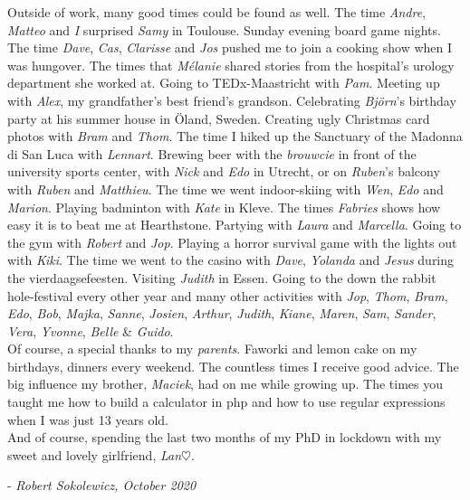 Outside of work, many good times could be found as well. The time \emph{Andre}, \emph{Matteo} and \emph{I} surprised \emph{Samy} in Toulouse. Sunday evening board game nights. The time \emph{Dave}, \emph{Cas}, \emph{Clarisse} and \emph{Jos} pushed me to join a cooking show when I was hungover. The times that \emph{M\'elanie} shared stories from the hospital's urology department she worked at. Going to TEDx-Maastricht with \emph{Pam}. Meeting up with \emph{Alex}, my grandfather's best friend's grandson. Celebrating \emph{Bj\"orn}'s birthday party at his summer house in \"Oland, Sweden. 
Creating ugly Christmas card photos with \emph{Bram} and \emph{Thom}. The time I hiked up the Sanctuary of the Madonna di San Luca with \emph{Lennart}. 
Brewing beer with the \emph{brouwcie} in front of the university sports center, with \emph{Nick} and \emph{Edo} in Utrecht, or on \emph{Ruben}'s balcony with \emph{Ruben} and \emph{Matthieu}. The time we went indoor-skiing with \emph{Wen}, \emph{Edo} and \emph{Marion}. Playing badminton with \emph{Kate} in Kleve. The times \emph{Fabries} shows how easy it is to beat me at Hearthstone. Partying with \emph{Laura} and \emph{Marcella}. Going to the gym with \emph{Robert} and \emph{Jop}. Playing a horror survival game with the lights out with \emph{Kiki}. The time we went to the casino with \emph{Dave}, \emph{Yolanda} and \emph{Jesus} during the vierdaagsefeesten.  Visiting \emph{Judith} in Essen. Going to the down the rabbit hole-festival every other year and many other activities with \emph{Jop}, \emph{Thom}, \emph{Bram}, \emph{Edo}, \emph{Bob}, \emph{Majka}, \emph{Sanne}, \emph{Josien}, \emph{Arthur}, \emph{Judith}, \emph{Kiane}, \emph{Maren}, \emph{Sam}, \emph{Sander}, \emph{Vera}, \emph{Yvonne}, \emph{Belle} \& \emph{Guido}. \\[0.5em]

Of course, a special thanks to my \emph{parents}. Faworki and lemon cake on my birthdays, dinners every weekend. The countless times I receive good advice. The big influence my brother, \emph{Maciek}, had on me while growing up. The times you taught me how to build a calculator in php and how to use regular expressions when I was just 13 years old.  \\[0.5em]

And of course, spending the last two months of my PhD in lockdown with my sweet and lovely girlfriend, \emph{Lan}$\heartsuit$.

\begin{flushright} - \emph{Robert Sokolewicz, October 2020}\end{flushright}
